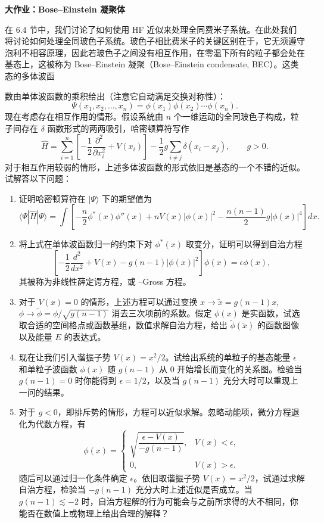 \begin{center}
\Large\bfseries 大作业：Bose--Einstein 凝聚体
\end{center}

在 6.4 节中，我们讨论了如何使用 HF 近似来处理全同费米子系统。在此处我们将讨论如何处理全同玻色子系统。玻色子相比费米子的关键区别在于，它无须遵守泡利不相容原理，因此若玻色子之间没有相互作用，在零温下所有的粒子都会处在基态上，这被称为 Bose--Einstein 凝聚（Bose--Einstein condensate, BEC）。这类态的多体波函

数由单体波函数的乘积给出（注意它自动满足交换对称性）：
\begin{equation}
 \Psi(x_1,x_2,\ldots,x_n)=\phi(x_1)\phi(x_2)\cdots\phi(x_n).
\tag{1}
\end{equation}
现在考虑存在相互作用的情形。假设系统由 $n$ 个一维运动的全同玻色子构成，粒子间存在 $\delta$ 函数形式的两两吸引，哈密顿算符写作
\begin{equation}
 \hat H=\sum_{i=1}^{n}\left[-\frac12\frac{\partial^2}{\partial x_i^2}+V(x_i)\right]
 -\frac12g\sum_{i\ne j}\delta(x_i-x_j),\qquad g>0.
\tag{2}
\end{equation}
对于相互作用较弱的情形，上述多体波函数的形式依旧是基态的一个不错的近似。试解答以下问题：
\begin{enumerate}[label=\arabic*.]
\item 证明哈密顿算符在 $|\Psi\rangle$ 下的期望值为
\[
 \langle\Psi|\hat H|\Psi\rangle
 =\int\left[-\frac n2\phi^*(x)\phi''(x)+nV(x)|\phi(x)|^2
 -\frac{n(n-1)}2g|\phi(x)|^4\right]dx.
\]
\item 将上式在单体波函数归一的约束下对 $\phi^*(x)$ 取变分，证明可以得到自治方程
\[
 \left[-\frac12\frac{d^2}{dx^2}+V(x)-g(n-1)|\phi(x)|^2\right]\phi(x)=\epsilon\phi(x),
\]
其被称为非线性薛定谔方程，或 --Gross 方程。
\item 对于 $V(x)=0$ 的情形，上述方程可以通过变换 $x\to\tilde x=g(n-1)x$, $\phi\to\tilde\phi=\phi/\sqrt{g(n-1)}$ 消去三次项前的系数。假定 $\phi(x)$ 是实函数，试选取合适的空间格点或函数基组，数值求解自治方程，给出 $\tilde\phi(\tilde x)$ 的函数图像以及能量 $E$ 的表达式。
\item 现在让我们引入谐振子势 $V(x)=x^2/2$。试给出系统的单粒子的基态能量 $\epsilon$ 和单粒子波函数 $\phi(x)$ 随 $g(n-1)$ 从 0 开始增长而变化的关系图。检验当 $g(n-1)=0$ 时你能得到 $\epsilon=1/2$，以及当 $g(n-1)$ 充分大时可以重现上一问的结果。
\item 对于 $g<0$，即排斥势的情形，方程可以近似求解。忽略动能项，微分方程退化为代数方程，有
\[
 \phi(x)=
 \begin{cases}
 \sqrt{\dfrac{\epsilon-V(x)}{-g(n-1)}},&V(x)<\epsilon,\\[2mm]
 0,&V(x)>\epsilon.
 \end{cases}
\]
随后可以通过归一化条件确定 $\epsilon$。依旧取谐振子势 $V(x)=x^2/2$，试通过求解自治方程，检验当 $-g(n-1)$ 充分大时上述近似是否成立。当 $g(n-1)\lesssim-2$ 时，自治方程解的行为可能会与之前所求得的大不相同，你能否在数值上或物理上给出合理的解释？
\end{enumerate}

